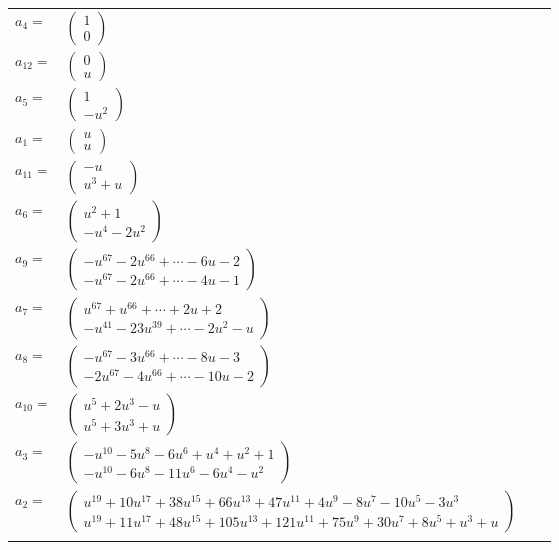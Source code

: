 \documentclass[1p]{elsarticle_modified}
\theoremstyle{definition}
\begin{document}
\begin{tabular}{m{7pt} m{180pt} m{7pt} m{180pt} }
\flushright $a_{4}=$&$\begin{pmatrix}1\\0\end{pmatrix}$ \\
\flushright $a_{12}=$&$\begin{pmatrix}0\\u\end{pmatrix}$ \\
\flushright $a_{5}=$&$\begin{pmatrix}1\\- u^2\end{pmatrix}$ \\
\flushright $a_{1}=$&$\begin{pmatrix}u\\u\end{pmatrix}$ \\
\flushright $a_{11}=$&$\begin{pmatrix}- u\\u^3+u\end{pmatrix}$ \\
\flushright $a_{6}=$&$\begin{pmatrix}u^2+1\\- u^4-2 u^2\end{pmatrix}$ \\
\flushright $a_{9}=$&$\begin{pmatrix}- u^{67}-2 u^{66}+\cdots-6 u-2\\- u^{67}-2 u^{66}+\cdots-4 u-1\end{pmatrix}$ \\
\flushright $a_{7}=$&$\begin{pmatrix}u^{67}+u^{66}+\cdots+2 u+2\\- u^{41}-23 u^{39}+\cdots-2 u^2- u\end{pmatrix}$ \\
\flushright $a_{8}=$&$\begin{pmatrix}- u^{67}-3 u^{66}+\cdots-8 u-3\\-2 u^{67}-4 u^{66}+\cdots-10 u-2\end{pmatrix}$ \\
\flushright $a_{10}=$&$\begin{pmatrix}u^5+2 u^3- u\\u^5+3 u^3+u\end{pmatrix}$ \\
\flushright $a_{3}=$&$\begin{pmatrix}- u^{10}-5 u^8-6 u^6+u^4+u^2+1\\- u^{10}-6 u^8-11 u^6-6 u^4- u^2\end{pmatrix}$ \\
\flushright $a_{2}=$&$\begin{pmatrix}u^{19}+10 u^{17}+38 u^{15}+66 u^{13}+47 u^{11}+4 u^9-8 u^7-10 u^5-3 u^3\\u^{19}+11 u^{17}+48 u^{15}+105 u^{13}+121 u^{11}+75 u^9+30 u^7+8 u^5+u^3+u\end{pmatrix}$\\&\end{tabular}
\end{document}
